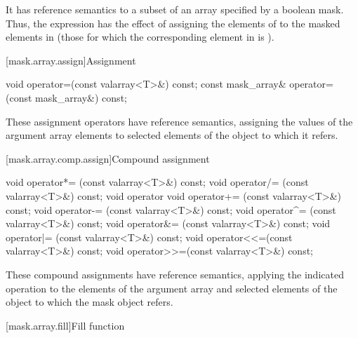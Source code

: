 \pnum
It has reference semantics to a subset of an array specified by a boolean mask.
Thus, the expression 
has the effect of assigning the elements of
 to the masked elements in 
(those for which the corresponding element in
 is ).

[mask.array.assign]{Assignment}

%
\begin{itemdecl}
void operator=(const valarray<T>&) const;
const mask_array& operator=(const mask_array&) const;
\end{itemdecl}

\begin{itemdescr}
\pnum
These assignment operators have reference semantics, assigning the values
of the argument array elements to selected elements of the
object to which it refers.
\end{itemdescr}

[mask.array.comp.assign]{Compound assignment}

%
%
%
%
%
%
%
%
%
%
\begin{itemdecl}
void operator*= (const valarray<T>&) const;
void operator/= (const valarray<T>&) const;
void operator%
void operator+= (const valarray<T>&) const;
void operator-= (const valarray<T>&) const;
void operator^= (const valarray<T>&) const;
void operator&= (const valarray<T>&) const;
void operator|= (const valarray<T>&) const;
void operator<<=(const valarray<T>&) const;
void operator>>=(const valarray<T>&) const;
\end{itemdecl}

\begin{itemdescr}
\pnum
These compound assignments have reference semantics, applying the
indicated operation to the elements of the argument array and selected elements
of the
object to which the mask object refers.
\end{itemdescr}

[mask.array.fill]{Fill function}

